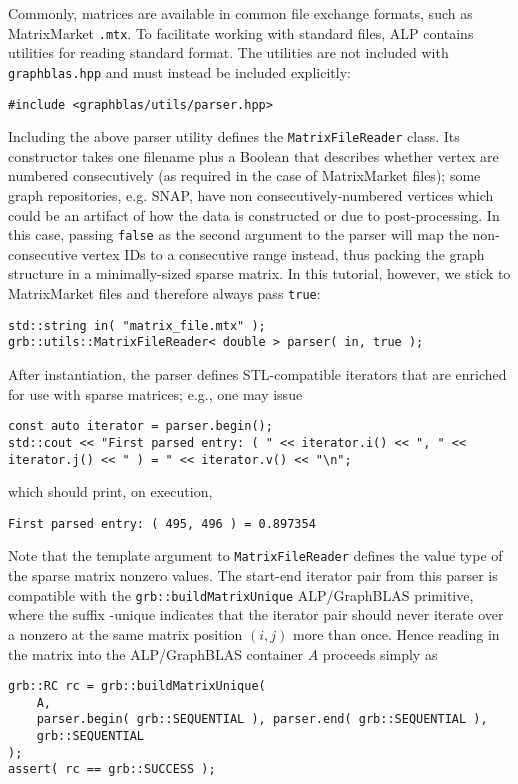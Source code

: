 Commonly, matrices are available in common file exchange formats, such as MatrixMarket \texttt{.mtx}. To facilitate working with standard files, ALP contains utilities for reading standard format. The utilities are not included with \texttt{graphblas.hpp} and must instead be included explicitly:
\begin{lstlisting}
#include <graphblas/utils/parser.hpp>
\end{lstlisting}
Including the above parser utility defines the \texttt{MatrixFileReader} class. Its constructor takes one filename plus a Boolean that describes whether vertex are numbered consecutively (as required in the case of MatrixMarket files); some graph repositories, e.g. SNAP, have non consecutively-numbered vertices which could be an artifact of how the data is constructed or due to post-processing. In this case, passing \texttt{false} as the second argument to the parser will map the non-consecutive vertex IDs to a consecutive range instead, thus packing the graph structure in a minimally-sized sparse matrix. In this tutorial, however, we stick to MatrixMarket files and therefore always pass \texttt{true}:
\begin{lstlisting}
std::string in( "matrix_file.mtx" );
grb::utils::MatrixFileReader< double > parser( in, true );
\end{lstlisting}
After instantiation, the parser defines STL-compatible iterators that are enriched for use with sparse matrices; e.g., one may issue
\begin{lstlisting}
const auto iterator = parser.begin();
std::cout << "First parsed entry: ( " << iterator.i() << ", " << iterator.j() << " ) = " << iterator.v() << "\n";
\end{lstlisting}
which should print, on execution,
\begin{lstlisting}
First parsed entry: ( 495, 496 ) = 0.897354
\end{lstlisting}
Note that the template argument to \texttt{MatrixFileReader} defines the value type of the sparse matrix nonzero values. The start-end iterator pair from this parser is compatible with the \texttt{grb::buildMatrixUnique} ALP/GraphBLAS primitive, where the suffix -unique indicates that the iterator pair should never iterate over a nonzero at the same matrix position $(i,j)$ more than once. Hence reading in the matrix into the ALP/GraphBLAS container $A$ proceeds simply as
\begin{lstlisting}
grb::RC rc = grb::buildMatrixUnique(
    A,
    parser.begin( grb::SEQUENTIAL ), parser.end( grb::SEQUENTIAL ),
    grb::SEQUENTIAL
);
assert( rc == grb::SUCCESS );
\end{lstlisting}

